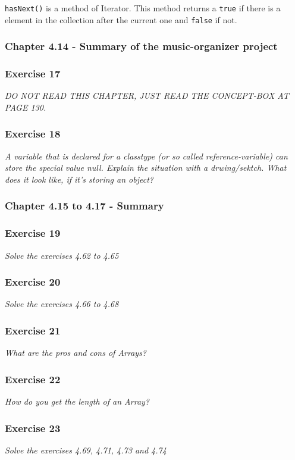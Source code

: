 \lstinline{hasNext()} is a method of Iterator. This method returns a 
\lstinline{true} if there is a element in the collection after the current 
one and \lstinline{false} if not.

\subsubsection{Chapter 4.14 - Summary of the music-organizer project}

\subsubsection*{Exercise 17}
\textit{DO NOT READ THIS CHAPTER, JUST READ THE CONCEPT-BOX AT PAGE 130.}\\

\subsubsection*{Exercise 18}
\textit{A variable that is declared for a classtype (or so called 
reference-variable) can store the special value null. Explain the situation 
with a drwing/sektch. What does it look like, if it's storing an object?}\\

\subsubsection{Chapter 4.15 to 4.17 - Summary}

\subsubsection*{Exercise 19}
\textit{Solve the exercises 4.62 to 4.65}\\

\subsubsection*{Exercise 20}
\textit{Solve the exercises 4.66 to 4.68}\\

\subsubsection*{Exercise 21}
\textit{What are the pros and cons of Arrays?}\\

\subsubsection*{Exercise 22}
\textit{How do you get the length of an Array?}\\

\subsubsection*{Exercise 23}
\textit{Solve the exercises 4.69, 4.71, 4.73 and 4.74}\\




